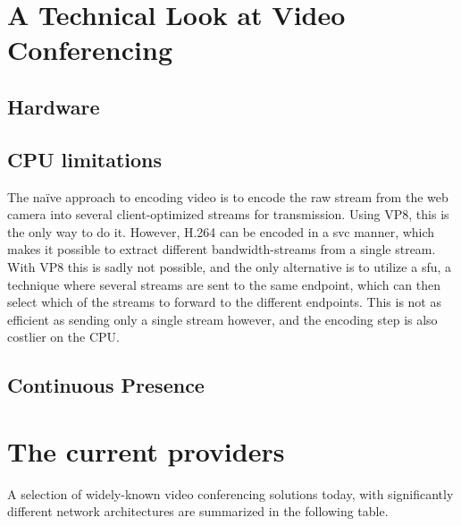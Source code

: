 \section{A Technical Look at Video Conferencing}

\subsection{Hardware}



\subsection{CPU limitations}

The naïve approach to encoding video is to encode the raw stream from the web camera into several client-optimized streams for transmission. Using VP8, this is the only way to do it. However, H.264 can be encoded in a \gls{svc} manner, which makes it possible to extract different bandwidth-streams from a single stream. With VP8 this is sadly not possible, and the only alternative is to utilize a \gls{sfu}, a technique where several streams are sent to the same endpoint, which can then select which of the streams to forward to the different endpoints. This is not as efficient as sending only a single stream however, and the encoding step is also costlier on the CPU.


\subsection{Continuous Presence}




\section{The current providers}

A selection of widely-known video conferencing solutions today, with significantly different network architectures are summarized in the following table.

